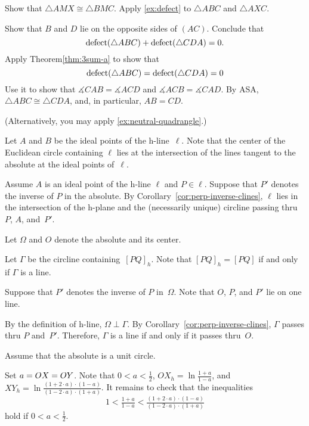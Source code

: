Show that $\triangle AMX\cong \triangle BMC$. 
Apply \ref{ex:defect} to $\triangle ABC$ and $\triangle AXC$.


Show that $B$ and $D$ lie on the opposite sides of $(AC)$.
Conclude that 
\[\mathop{\rm defect}\nolimits(\triangle ABC)+\mathop{\rm defect}\nolimits(\triangle CDA)=0.\]
Apply Theorem\ref{thm:3sum-a} to show that 
\[\mathop{\rm defect}\nolimits(\triangle ABC)=\mathop{\rm defect}\nolimits(\triangle CDA)=0\]
Use it to show that $\measuredangle CAB=\measuredangle ACD$ and $\measuredangle ACB=\measuredangle CAD$.
By ASA, $\triangle ABC\cong\triangle CDA$, and, in particular, $AB=CD$.

(Alternatively, you may apply \ref{ex:neutral-quadrangle}.)

\setcounter{eqtn}{0}

Let $A$ and $B$ be the ideal points of the h-line~$\ell$. 
Note that the center of the Euclidean circle containing $\ell$ lies 
at the intersection of the lines tangent to the absolute at the ideal points of~$\ell$.

Assume $A$ is an ideal point of the h-line $\ell$
and $P\in \ell$.
Suppose that $P'$ denotes the inverse of $P$ in the absolute.
By Corollary~\ref{cor:perp-inverse-clines},
$\ell$ lies in the intersection of the h-plane and the (necessarily unique) circline 
passing thru $P$, $A$, and~$P'$.

Let $\Omega$ and $O$ denote the absolute and its center. 

Let $\Gamma$ be the circline containing~$[PQ]_h$.
Note that $[PQ]_h=[PQ]$ if and only if $\Gamma$ is a line.

Suppose that $P'$ denotes the inverse of $P$ in~$\Omega$.
Note that $O$, $P$, and $P'$ lie on one line.

By the definition of h-line, $\Omega\perp \Gamma$.
By Corollary~\ref{cor:perp-inverse-clines}, $\Gamma$ passes thru $P$ and~$P'$. 
Therefore, $\Gamma$
is a line if and only if it passes thru~$O$.

Assume that the absolute is a unit circle.

Set $a\z=OX\z=OY$.
Note that $0<a<\tfrac12$,
$
OX_h=\ln \tfrac{1+a}{1-a}$,
and
$XY_h=\ln \tfrac{(1+2\cdot a)\cdot(1-a)}{(1-2\cdot a)\cdot(1+a)}$.
It remains to check that the inequalities 
\[1<
\tfrac{1+a}{1-a}
<
\tfrac{(1+2\cdot a)\cdot(1-a)}{(1-2\cdot a)\cdot(1+a)}\]
hold if $0<a<\tfrac12$.

